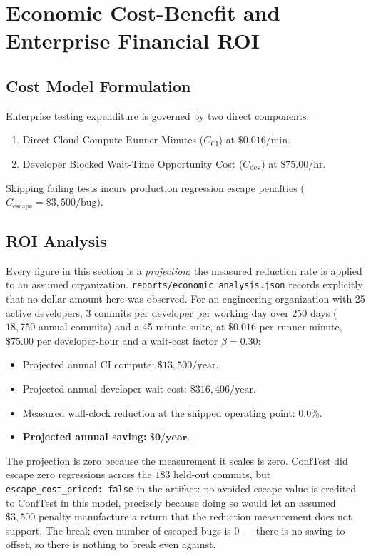 \chapter{Economic Cost-Benefit and Enterprise Financial ROI}

\section{Cost Model Formulation}
Enterprise testing expenditure is governed by two direct components:
\begin{enumerate}
    \item Direct Cloud Compute Runner Minutes ($C_{\text{CI}}$) at $\$0.016/\text{min}$.
    \item Developer Blocked Wait-Time Opportunity Cost ($C_{\text{dev}}$) at $\$75.00/\text{hr}$.
\end{enumerate}
Skipping failing tests incurs production regression escape penalties ($C_{\text{escape}} = \$3,500/\text{bug}$).

\section{ROI Analysis}
Every figure in this section is a \emph{projection}: the measured reduction rate is applied to an assumed
organization. \texttt{reports/economic\_analysis.json} records explicitly that no dollar amount here was
observed. For an engineering organization with 25 active developers, 3 commits per developer per working
day over 250 days ($18{,}750$ annual commits) and a 45-minute suite, at $\$0.016$ per runner-minute,
$\$75.00$ per developer-hour and a wait-cost factor $\beta = 0.30$:

\begin{itemize}
    \item Projected annual CI compute: $\$13{,}500/\text{year}$.
    \item Projected annual developer wait cost: $\$316{,}406/\text{year}$.
    \item Measured wall-clock reduction at the shipped operating point: $\mathbf{0.0\%}$.
    \item \textbf{Projected annual saving:} $\mathbf{\$0/\text{year}}$.
\end{itemize}

The projection is zero because the measurement it scales is zero. ConfTest did escape zero regressions
across the $183$ held-out commits, but \texttt{escape\_cost\_priced: false} in the artifact: no
avoided-escape value is credited to ConfTest in this model, precisely because doing so would let an
assumed $\$3{,}500$ penalty manufacture a return that the reduction measurement does not support. The
break-even number of escaped bugs is $0$ --- there is no saving to offset, so there is nothing to break
even against.

